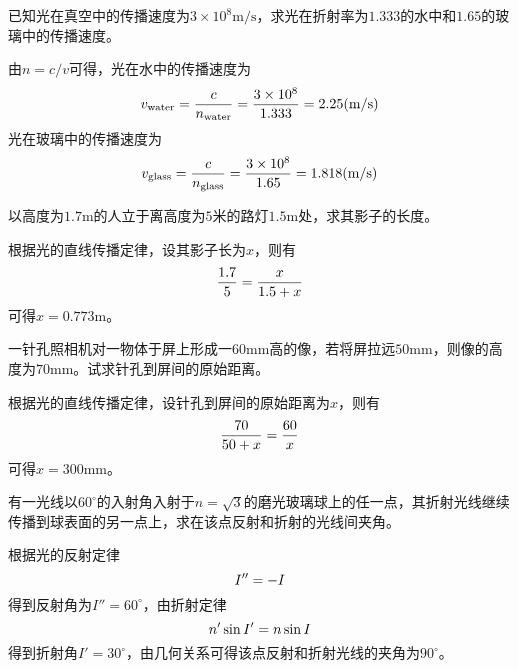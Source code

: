 \begin{problem}
	已知光在真空中的传播速度为$3\times10^8\mathrm{m/s}$，求光在折射率为$1.333$的水中和$1.65$的玻璃中的传播速度。
\end{problem}
\begin{solution}
	由$n=c/v$可得，光在水中的传播速度为
	\begin{equation}
	v_{\mathrm{water}}=\frac{c}{n_{\mathrm{water}}}=\frac{3\times10^8}{1.333}=2.25(\mathrm{m/s})\notag
	\end{equation}
	光在玻璃中的传播速度为
	\begin{equation}
	v_{\mathrm{glass}}=\frac{c}{n_{\mathrm{glass}}}=\frac{3\times10^8}{1.65}=1.818(\mathrm{m/s})\notag
	\end{equation}
\end{solution}

\begin{problem}
	以高度为$1.7\mathrm{m}$的人立于离高度为$5$米的路灯$1.5\mathrm{m}$处，求其影子的长度。
\end{problem}
\begin{solution}
	根据光的直线传播定律，设其影子长为$x$，则有
	\begin{equation}
	\frac{1.7}{5}=\frac{x}{1.5+x}\notag
	\end{equation}
	可得$x=0.773\mathrm{m}$。
\end{solution}

\begin{problem}
	一针孔照相机对一物体于屏上形成一$60\mathrm{mm}$高的像，若将屏拉远$50\mathrm{mm}$，则像的高度为$70\mathrm{mm}$。试求针孔到屏间的原始距离。
\end{problem}
\begin{solution}
	根据光的直线传播定律，设针孔到屏间的原始距离为$x$，则有
	\begin{equation}
	\frac{70}{50+x}=\frac{60}{x}\notag
	\end{equation}
	可得$x=300\mathrm{mm}$。
\end{solution}

\begin{problem}
	有一光线以$60^{\circ}$的入射角入射于$n=\sqrt{3}$的磨光玻璃球上的任一点，其折射光线继续传播到球表面的另一点上，求在该点反射和折射的光线间夹角。
\end{problem}
\begin{solution}
	根据光的反射定律
	\begin{equation}
	I''=-I\notag
	\end{equation}
	得到反射角为$I''=60^{\circ}$，由折射定律
	\begin{equation}
	n'\sin I'=n\sin I\notag
	\end{equation}
	得到折射角$I'=30^{\circ}$，由几何关系可得该点反射和折射光线的夹角为$90^{\circ}$。
\end{solution}

